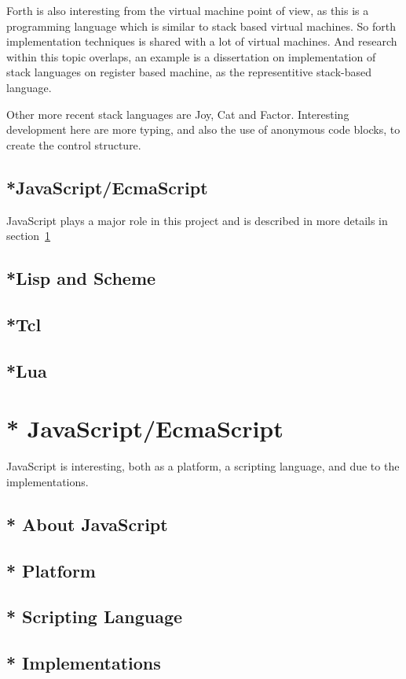 Forth is also interesting from the virtual machine point of view, as this is a programming language which is similar to stack based virtual machines. So forth implementation techniques is shared with a lot of virtual machines. And research within this topic overlaps, an example is a dissertation on implementation of stack languages on register based machine\cite{ertl-dissertation}, as the representitive stack-based language.

Other more recent stack languages are Joy\cite{joy-language}, Cat\cite{cat-language} and Factor\cite{factor-language}.
Interesting development here are more typing, and also the use of anonymous code blocks, 
to create the control structure.

\subsection{*JavaScript/EcmaScript}
JavaScript plays a major role in this project and is described in more details in section~\ref{javascript}
\subsection{*Lisp and Scheme}
\subsection{*Tcl}
\subsection{*Lua}

\section{* JavaScript/EcmaScript}
\label{javascript}
JavaScript is interesting, both as a platform, a scripting language, and due to the implementations.

\subsection{* About JavaScript}
\subsection{* Platform}
\subsection{* Scripting Language}
\subsection{* Implementations}
